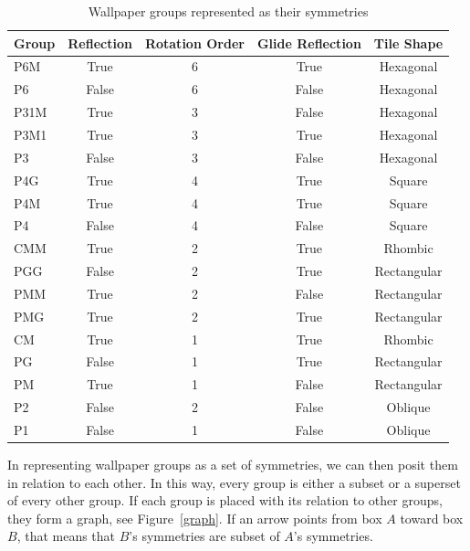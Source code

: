 \begin{table}[!ht]
\centering
\begin{tabular}{|l|c|c|c|c|}
\hline
Group & Reflection & Rotation Order & Glide Reflection & Tile Shape \\ \hline
P6M & True & 6 & True & Hexagonal \\ \hline
P6 & False & 6 & False & Hexagonal \\ \hline
P31M & True & 3 & False & Hexagonal \\ \hline
P3M1 & True & 3 & True & Hexagonal \\ \hline
P3 & False & 3 & False & Hexagonal \\ \hline
P4G & True & 4 & True & Square \\ \hline
P4M & True & 4 & True & Square \\ \hline
P4 & False & 4 & False & Square \\ \hline
CMM & True & 2 & True & Rhombic \\ \hline
PGG & False& 2& True& Rectangular \\ \hline
PMM& True& 2& False& Rectangular \\ \hline
PMG& True& 2& True& Rectangular \\ \hline
CM & True& 1& True& Rhombic \\ \hline
PG & False& 1& True& Rectangular \\ \hline
PM& True& 1& False& Rectangular \\ \hline
P2& False& 2& False& Oblique \\ \hline
P1& False& 1& False& Oblique \\ \hline
\end{tabular}
\label{sym-tab}
\caption{Wallpaper groups represented as their symmetries}
\end{table}

In representing wallpaper groups as a set of symmetries, we can then posit them in relation to each other. In this way, every group is either a subset or a superset of every other group.  If each group is placed with its relation to other groups, they form a graph, see Figure~\ref{graph}. If an arrow points from box $A$ toward box $B$, that means that $B$'s symmetries are subset of $A$'s symmetries.